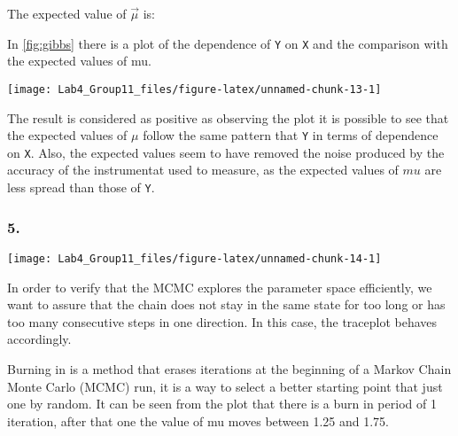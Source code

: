\documentclass[]{article}
\let\origfigure\figure
\let\endorigfigure\endfigure
\renewenvironment{figure}[1][2] {
    \expandafter\origfigure\expandafter[H]
} {
    \endorigfigure
}
\begin{document}
The expected value of \(\vec\mu\) is:

In \ref{fig:gibbs} there is a plot of the dependence of \texttt{Y} on
\texttt{X} and the comparison with the expected values of mu.

\begin{figure}[h]

{\centering \texttt{[image: Lab4\_Group11\_files/figure-latex/unnamed-chunk-13-1]} 

}

\caption{\label{fig:gibbs} Comparison between Y and expected value of mu}\label{fig:unnamed-chunk-13}
\end{figure}

The result is considered as positive as observing the plot it is
possible to see that the expected values of \(\mu\) follow the same
pattern that \texttt{Y} in terms of dependence on \texttt{X}. Also, the
expected values seem to have removed the noise produced by the accuracy
of the instrumentat used to measure, as the expected values of \(mu\)
are less spread than those of \texttt{Y}.

\hypertarget{section-10}{%
\subsubsection{5.}\label{section-10}}

\begin{figure}[h]

{\centering \texttt{[image: Lab4\_Group11\_files/figure-latex/unnamed-chunk-14-1]} 

}

\caption{\label{fig:burn_in} Burn in period and convergence}\label{fig:unnamed-chunk-14}
\end{figure}

In order to verify that the MCMC explores the parameter space
efficiently, we want to assure that the chain does not stay in the same
state for too long or has too many consecutive steps in one direction.
In this case, the traceplot behaves accordingly.

Burning in is a method that erases iterations at the beginning of a
Markov Chain Monte Carlo (MCMC) run, it is a way to select a better
starting point that just one by random. It can be seen from the plot
that there is a burn in period of 1 iteration, after that one the value
of mu moves between 1.25 and 1.75.

\hypertarget{section-11}{%
\subsection{\texorpdfstring{\pagebreak}{}}\label{section-11}}
\end{document}
